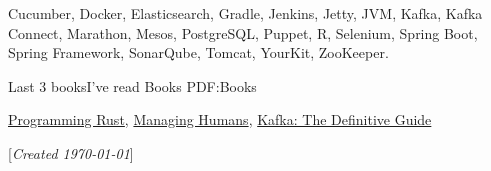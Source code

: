 \documentclass[letterpaper,MMMyyyy,nonstopmode]{simpleresumecv}
\newcommand{\CVNote}{Created {\today}}
\begin{document}
\begin{Body}
\Entry
Cucumber,
Docker,
Elasticsearch,
Gradle,
Jenkins,
Jetty,
JVM,
Kafka,
Kafka Connect,
Marathon,
Mesos,
PostgreSQL,
Puppet,
R,
Selenium,
Spring Boot,
Spring Framework,
SonarQube,
Tomcat,
YourKit,
ZooKeeper.
\BigGap


\Section
{Last 3 books\newline I've read}
{Books}
{PDF:Books}


\Entry
\href{https://www.amazon.com/Programming-Rust-Fast-Systems-Development/dp/1491927283}{Programming Rust},
\href{https://www.amazon.com/Managing-Humans-Humorous-Software-Engineering/dp/1484221575}{Managing Humans},
\href{https://www.amazon.com/Kafka-Definitive-Real-Time-Stream-Processing/dp/1491936169}{Kafka: The Definitive Guide}

\BigGap


\end{Body}


\BigGap
\UseNoteFont%
\null\hfill%
[\textit{\CVNote}]
\end{document}
